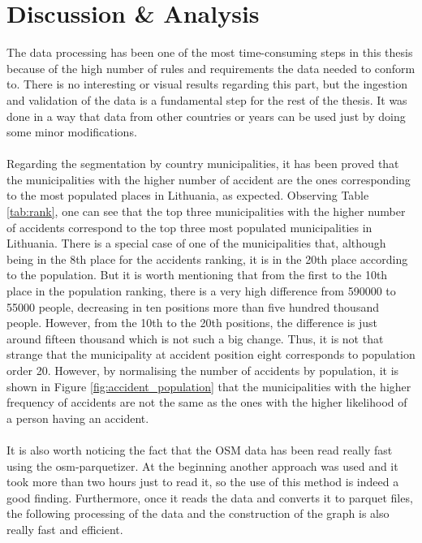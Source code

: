 \chapter{Discussion \& Analysis} \label{ch:discussion}
The data processing has been one of the most time-consuming steps in this thesis because of the high number of rules and requirements the data needed to conform to. There is no interesting or visual results regarding this part, but the ingestion and validation of the data is a fundamental step for the rest of the thesis. It was done in a way that data from other countries or years can be used just by doing some minor modifications.\\
\\
Regarding the segmentation by country municipalities, it has been proved that the municipalities with the higher number of accident are the ones corresponding to the most populated places in Lithuania, as expected. Observing Table \ref{tab:rank}, one can see that the top three municipalities with the higher number of accidents correspond to the top three most populated municipalities in Lithuania. There is a special case of one of the municipalities that, although being in the 8th place for the accidents ranking, it is in the 20th place according to the population. But it is worth mentioning that from the first to the 10th place in the population ranking, there is a very high difference from 590000 to 55000 people, decreasing in ten positions more than five hundred thousand people. However, from the 10th to the 20th positions, the difference is just around fifteen thousand which is not such a big change. Thus, it is not that strange that the municipality at accident position eight corresponds to population order 20. However, by normalising the number of accidents by population, it is shown in Figure \ref{fig:accident_population} that the municipalities with the higher frequency of accidents are not the same as the ones with the higher likelihood of a person having an accident. 
\\
\\
It is also worth noticing the fact that the \ac{OSM} data has been read really fast using the osm-parquetizer. At the beginning another approach was used and it took more than two hours just to read it, so the use of this method is indeed a good finding. Furthermore, once it reads the data and converts it to parquet files, the following processing of the data and the construction of the graph is also really fast and efficient.
\\
